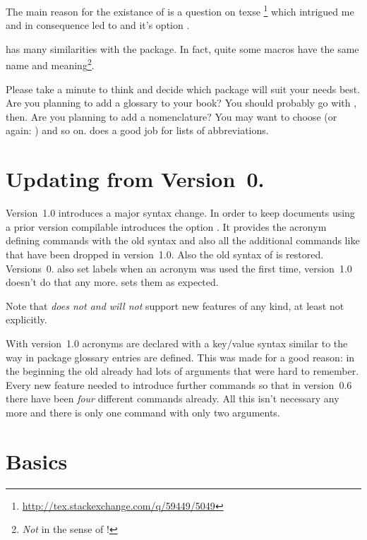 \documentclass[DIV10,toc=index,toc=bib,hyperfootnotes=false]{cnpkgdoc}
\makeatletter
\newcommand\versionstar{\texorpdfstring{\@versionstar}{*}}
\makeatother
\begin{document}
The main reason for the existance of \acro is a question on \acs{texse}%
\footnote{\url{http://tex.stackexchange.com/q/59449/5049}} which intrigued
me and in consequence led to \acro and it's option .

\acro has many similarities with the  package. In fact, quite
some macros have the same name and meaning\footnote{\emph{Not} in the sense of
\code{\textbackslash\textcolor{code}{meaning}}!}.

Please take a minute to think and decide which package will suit your needs
best. Are you planning to add a glossary to your book? You should probably go
with , then. Are you planning to add a nomenclature? You
may want to choose  (or again: ) and so on.
\acro does a good job for lists of abbreviations.


\section{Updating from Version~0.\versionstar}
Version~1.0 introduces a major syntax change. In order to keep documents
using a prior version compilable \acro introduces the option .
It provides the acronym defining commands with the old syntax and also all the
additional commands like  that have been dropped in
version~1.0. Also the old syntax of  is restored.
Versions~0.\versionstar{} also set labels when an acronym was used the first time,
version~1.0 doesn't do that any more.  sets them as expected.

Note that  \emph{does not and will not} support new features of
any kind, at least not explicitly.

With version~1.0 acronyms are declared with a key/value syntax similar to the
way in package  glossary entries are defined. This was made
for a good reason: in the beginning the old  already had
lots of arguments that were hard to remember. Every new feature needed to
introduce further commands so that in version~0.6 there have been \emph{four}
different commands already. All this isn't necessary any more and there is only
one command with only two arguments.

\section{Basics}
\end{document}
